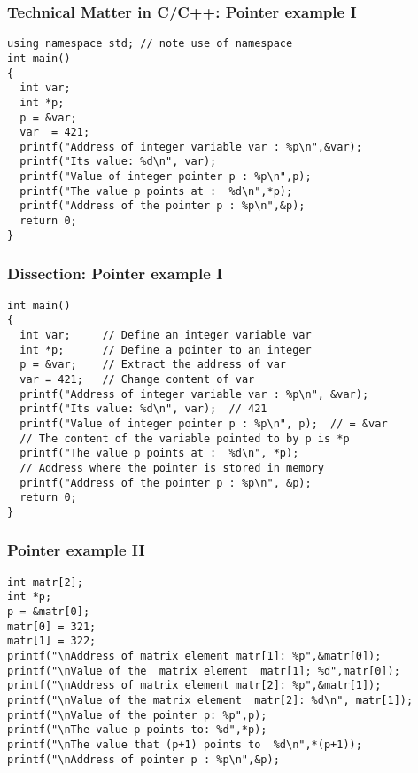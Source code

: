 \documentclass{beamer}
\newenvironment{block_mdfboxadmon}[1][]{\begin{block}{#1}}{\end{block}}
\begin{document}
\begin{frame}
\frametitle{Technical Matter in C/C++: Pointer example I}

\begin{block_mdfboxadmon}[]
\begin{verbatim}
using namespace std; // note use of namespace
int main()
{
  int var;
  int *p;
  p = &var;
  var  = 421;
  printf("Address of integer variable var : %p\n",&var);
  printf("Its value: %d\n", var);
  printf("Value of integer pointer p : %p\n",p);
  printf("The value p points at :  %d\n",*p);
  printf("Address of the pointer p : %p\n",&p);
  return 0;
}
\end{verbatim}
\end{block_mdfboxadmon}
\end{frame}

\begin{frame}
\frametitle{Dissection: Pointer example I}

\begin{block_mdfboxadmon}[Discussion.]

\begin{verbatim}
int main()
{
  int var;     // Define an integer variable var
  int *p;      // Define a pointer to an integer
  p = &var;    // Extract the address of var
  var = 421;   // Change content of var
  printf("Address of integer variable var : %p\n", &var);
  printf("Its value: %d\n", var);  // 421
  printf("Value of integer pointer p : %p\n", p);  // = &var
  // The content of the variable pointed to by p is *p
  printf("The value p points at :  %d\n", *p);
  // Address where the pointer is stored in memory
  printf("Address of the pointer p : %p\n", &p);
  return 0;
}
\end{verbatim}
\end{block_mdfboxadmon}
\end{frame}

\begin{frame}
\frametitle{Pointer example II}

\begin{block_mdfboxadmon}[]
\begin{verbatim}
int matr[2];
int *p;
p = &matr[0];
matr[0] = 321;
matr[1] = 322;
printf("\nAddress of matrix element matr[1]: %p",&matr[0]);
printf("\nValue of the  matrix element  matr[1]; %d",matr[0]);
printf("\nAddress of matrix element matr[2]: %p",&matr[1]);
printf("\nValue of the matrix element  matr[2]: %d\n", matr[1]);
printf("\nValue of the pointer p: %p",p);
printf("\nThe value p points to: %d",*p);
printf("\nThe value that (p+1) points to  %d\n",*(p+1));
printf("\nAddress of pointer p : %p\n",&p);
\end{verbatim}
\end{block_mdfboxadmon}
\end{frame}
\end{document}
